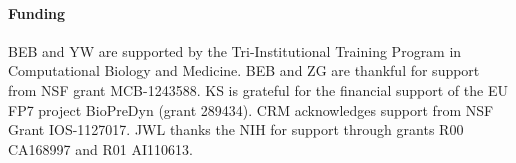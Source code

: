 \documentclass[draft]{bioinfo}
\begin{document}
\paragraph{Funding\textcolon}
BEB and YW are supported by the Tri-Institutional Training Program in Computational Biology and Medicine.
BEB and ZG are thankful for support from NSF grant MCB-1243588.
KS is grateful for the financial support of the EU FP7 project BioPreDyn (grant 289434).
CRM acknowledges support from NSF Grant IOS-1127017.
JWL thanks the NIH for support through grants R00 CA168997 and R01 AI110613.


%
%
%
%
%
%
%
%
%



\end{document}

